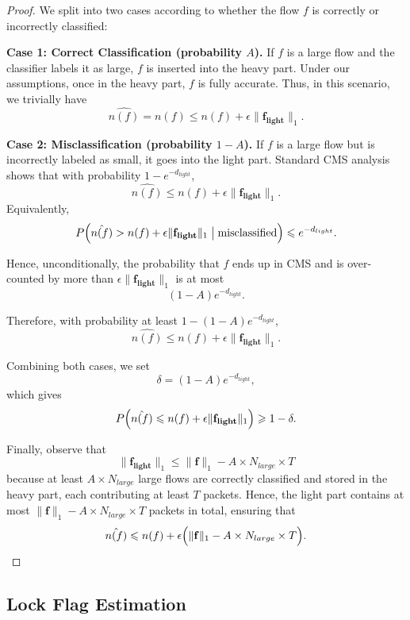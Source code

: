 \begin{proof}
We split into two cases according to whether the flow $f$ is correctly or incorrectly classified:

\textbf{Case 1: Correct Classification (probability \(A\)).}
%
If $f$ is a large flow and the classifier labels it as large, $f$ is inserted into the heavy part. 
Under our assumptions, once in the heavy part, $f$ is fully accurate. 
Thus, in this scenario, we trivially have
\[
  \hat{n(f)} = n(f) \leqslant n(f) + \epsilon \|\mathbf{f_{light}}\|_1.
\]


\textbf{Case 2: Misclassification (probability $1 - A$).}
If $f$ is a large flow but is incorrectly labeled as small, it goes into the light part. 
Standard CMS analysis shows that with probability $1 - e^{-d_{light}}$,
\[
  \hat{n(f)} \leqslant n(f) + \epsilon \|\mathbf{f_{light}}\|_1.
\]
Equivalently,
\[
  P\Bigl(\hat{n(f)} > n(f) + \epsilon \|\mathbf{f_{light}}\|_1 \bigm| \text{misclassified}\Bigr)
  \leqslant e^{-d_{light}}.
\]


Hence, unconditionally, the probability that \(f\) ends up in CMS and is over-counted by more than \(\epsilon \|\mathbf{f_{light}}\|_1\) is at most
\[
  (1 - A) e^{-d_{light}}.
\]


Therefore, with probability at least \(1 - (1 - A) e^{-d_{light}}\),
\[
    \hat{n(f)} \leqslant n(f) + \epsilon \|\mathbf{f_{light}}\|_1.
\]

Combining both cases, we set
\[
  \delta = (1 - A) e^{-d_{light}},
\]
which gives
\[
    P\Bigl(\hat{n(f)} \leqslant n(f) + \epsilon \|\mathbf{f_{light}}\|_1\Bigr) \geqslant 1 - \delta.
\]

Finally, observe that
\[
    \|\mathbf{f_{light}}\|_1 \leqslant \|\mathbf{f}\|_1 - A \times N_{large} \times T
\]
because at least $A\times N_{large}$ large flows are correctly classified and stored in the heavy part, each contributing at least $T$ packets. 
Hence, the light part contains at most $\|\mathbf{f}\|_1 - A\times N_{large} \times T$ packets in total, ensuring that 
\[
    \hat{n(f)} \leqslant n(f) + \epsilon \Bigl(\|\mathbf{f}\|_1 - A\times N_{large} \times T\Bigr).
\]

\end{proof}




\subsection{Lock Flag Estimation}


